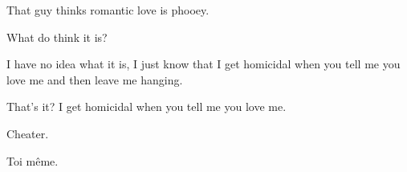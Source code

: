

That guy thinks romantic love is phooey.

What do think it is?

I have no idea what it is, I just know that I get homicidal when you
tell me you love me and then leave me hanging.

That's it?  I get homicidal when you tell me you love me.

Cheater.

Toi m\^eme.

\bye
